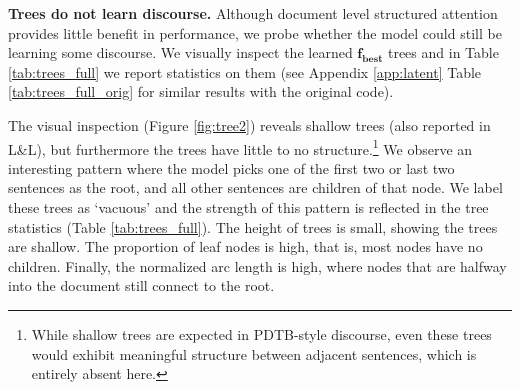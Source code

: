 \begin{table}[t]
\small
\centering
\renewcommand{\tabcolsep}{1.3mm}
\vspace{-0.7em}
\caption{Statistics for learned trees averaged across four runs (similar results without the design change or bug fix are in the Appendix \ref{app:latent} Table \ref{tab:trees_full_orig}). See Table \ref{tab:results_deeper} for gold statistics on WQTC.}
\label{tab:trees_full}
\end{table}

\medskip
\noindent\textbf{Trees do not learn discourse.} Although document  level structured attention provides little benefit in performance, we probe whether the model could still be learning some discourse. We visually inspect the learned $\mathbf{f_{best}}$ trees and in Table \ref{tab:trees_full} we report statistics on them (see Appendix \ref{app:latent} Table \ref{tab:trees_full_orig} for similar results with the original code).

The visual inspection (Figure \ref{fig:tree2}) reveals shallow trees (also reported in L\&L), but furthermore the trees have little to no structure.\footnote{While shallow trees are expected in PDTB-style discourse, even these trees would exhibit meaningful structure between adjacent sentences, which is entirely absent here. %
} We observe an interesting pattern where the model picks one of the first two or last two sentences as the root, and all other sentences are children of that node. We label these trees as `vacuous' and the strength of this pattern is  reflected in the tree statistics (Table \ref{tab:trees_full}). The height of trees is small, showing the trees are shallow. The proportion of leaf nodes is high, that is, most nodes have no children. Finally, 
the normalized arc length is high, where nodes that are  halfway into the document still connect to the root. 

